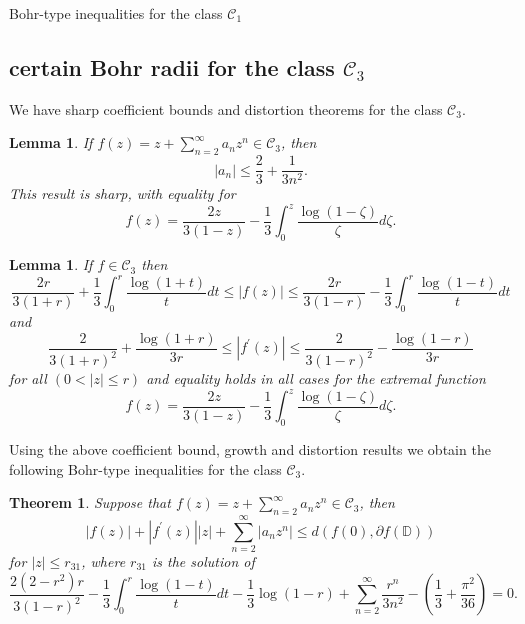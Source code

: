 \documentclass[12pt,a4paper,reqno]{amsart}
\theoremstyle{definition}
\theoremstyle{plain}
\newtheorem{theorem}[definition]{Theorem}
\newtheorem{lemma}[definition]{Lemma}
\numberwithin{equation}{section}
\begin{document}
\begin{section}{Bohr-type inequalities for the class $\mathcal{C}_1$}
\section{certain Bohr radii for the class $\mathcal{C}_3$}
\noindent
We have sharp coefficient bounds and distortion theorems for the class $\mathcal{C}_3$.
\begin{lemma} {\cite{Sil1972}}\label{lm3}
If $f(z)= z + \sum_{n=2}^{\infty} a_n z^n \in \mathcal{C}_3$, then
\begin{equation}\label{coef3}
 |a_n| \le \frac{2}{3} + \frac{1}{3n^2}  .
\end{equation}
This result is sharp, with equality for
\begin{equation*}
    f(z)= \frac{2z}{3(1-z)} - \frac{1}{3} \int_{0}^{z} \frac{\log(1-\zeta)}{\zeta} d\zeta.
\end{equation*}
\end{lemma}
\begin{lemma} {\cite{Sil1972}}\label{lm4}
If $f \in \mathcal{C}_3$ then
\begin{equation}
\frac{2r}{3(1+r)}+\frac{1}{3} \int_{0}^{r} \frac{\log(1+t)}{t} dt
\le |f(z)|
\le \frac{2r}{3(1-r)}-\frac{1}{3} \int_{0}^{r} \frac{\log(1-t)}{t} dt
\label{growth3}
\end{equation}
and
\begin{equation}
\frac{2}{3(1+r)^2}+ \frac{\log(1+r)}{3r}
\le |f^{'}(z)| \le
\frac{2}{3(1-r)^2}- \frac{\log(1-r)}{3r}
\label{distortion3}
\end{equation}
for all $(0 < |z| \le r)$ and equality holds in all cases for the extremal function
\begin{equation*}
    f(z)= \frac{2z}{3(1-z)} - \frac{1}{3} \int_{0}^{z} \frac{\log(1-\zeta)}{\zeta} d\zeta.
\end{equation*}
\end{lemma}
\noindent
Using the above coefficient bound, growth and distortion results we obtain the following Bohr-type inequalities for the class $\mathcal{C}_3$.
\begin{theorem}\label{th2}
Suppose that $f(z)=z + \sum_{n=2}^{\infty} a_n z^n \in \mathcal{C}_3$, then
\begin{equation}\label{2.3.1}
|f(z)| + |f^{'}(z)||z| + \sum_{n=2}^{\infty} |a_n z^n| \le d( f(0), \partial{f(\mathbb{D})})
\end{equation}
for $|z| \le r_{31}$, where $r_{31}$ is the solution of
\begin{equation*}
\frac{2 (2-r^2) r}{3 (1-r)^2}-\frac{1}{3} \int_{0}^{r} \frac{\log(1-t)}{t} dt-\frac{1}{3} \log(1-r)+ \sum_{n=2}^{\infty} \frac{r^n}{3 n^2}-\left(\frac{1}{3}+\frac{\pi ^2}{36}\right)=0.

\end{equation*}
\end{theorem}
\end{section}
\end{document}

